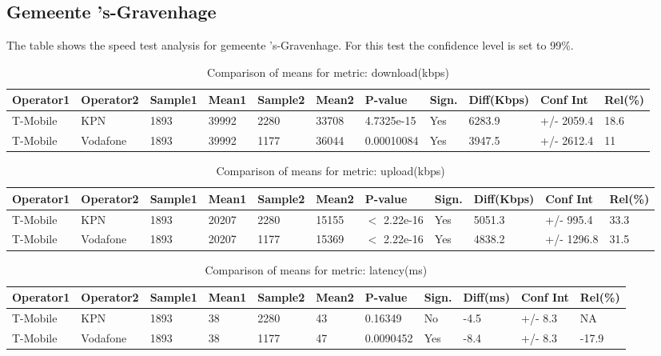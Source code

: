 \documentclass[]{article}
\begin{document}
\normalsize

\newpage

\subsection{Gemeente 's-Gravenhage}\label{gemeente-s-gravenhage}

The table shows the speed test analysis for gemeente 's-Gravenhage. For
this test the confidence level is set to 99\%.

\begin{table}[ht]
\centering
{\footnotesize
\begin{tabular}{lllllllllll}
  \hline
Operator1 & Operator2 & Sample1 & Mean1 & Sample2 & Mean2 & P-value & Sign. & Diff(Kbps) & Conf Int & Rel(\%) \\ 
  \hline
T-Mobile & KPN & 1893 & 39992 & 2280 & 33708 & 4.7325e-15 & Yes & 6283.9 & +/- 2059.4 & 18.6 \\ 
  T-Mobile & Vodafone & 1893 & 39992 & 1177 & 36044 & 0.00010084 & Yes & 3947.5 & +/- 2612.4 & 11 \\ 
   \hline
\end{tabular}
}
\caption{Comparison of means for metric: download(kbps)} 
\end{table}\begin{table}[ht]
\centering
{\footnotesize
\begin{tabular}{lllllllllll}
  \hline
Operator1 & Operator2 & Sample1 & Mean1 & Sample2 & Mean2 & P-value & Sign. & Diff(Kbps) & Conf Int & Rel(\%) \\ 
  \hline
T-Mobile & KPN & 1893 & 20207 & 2280 & 15155 & $<$ 2.22e-16 & Yes & 5051.3 & +/- 995.4 & 33.3 \\ 
  T-Mobile & Vodafone & 1893 & 20207 & 1177 & 15369 & $<$ 2.22e-16 & Yes & 4838.2 & +/- 1296.8 & 31.5 \\ 
   \hline
\end{tabular}
}
\caption{Comparison of means for metric: upload(kbps)} 
\end{table}\begin{table}[ht]
\centering
{\footnotesize
\begin{tabular}{lllllllllll}
  \hline
Operator1 & Operator2 & Sample1 & Mean1 & Sample2 & Mean2 & P-value & Sign. & Diff(ms) & Conf Int & Rel(\%) \\ 
  \hline
T-Mobile & KPN & 1893 & 38 & 2280 & 43 & 0.16349 & No & -4.5 & +/- 8.3 & NA \\ 
  T-Mobile & Vodafone & 1893 & 38 & 1177 & 47 & 0.0090452 & Yes & -8.4 & +/- 8.3 & -17.9 \\ 
   \hline
\end{tabular}
}
\caption{Comparison of means for metric: latency(ms)} 
\end{table}
\end{document}

